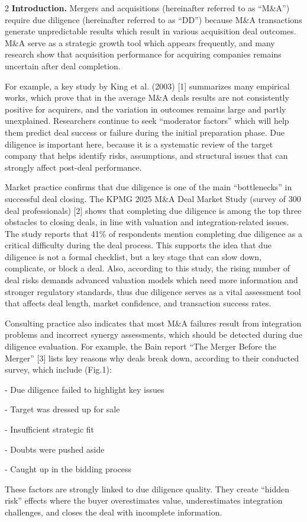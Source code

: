 \begin{multicols}{2}
{\bfseries Introduction.} Mergers and acquisitions (here\-inafter referred to
as ``M\&A'') require due diligence (hereinafter referred to as ``DD'')
because M\&A transactions generate unpredictable results which result in
various acquisition deal outcomes. M\&A serve as a strategic growth tool
which appears frequently, and many research show that acquisition
performance for acquiring companies remains uncertain after deal
completion.

For example, a key study by King et al. (2003) {[}1{]} summarizes many
empirical works, which prove that in the average M\&A deals results are
not consistently positive for acquirers, and the variation in outcomes
remains large and partly unexplained. Researchers continue to seek
``moderator factors'' which will help them predict deal success or
failure during the initial preparation phase. Due diligence is important
here, because it is a systematic review of the target company that helps
identify risks, assumptions, and structural issues that can strongly
affect post-deal performance.

Market practice confirms that due diligence is one of the main
``bottlenecks'' in successful deal closing. The KPMG 2025 M\&A Deal
Market Study (survey of 300 deal professionals) {[}2{]} shows that
completing due diligence is among the top three obstacles to closing
deals, in line with valuation and integration-related issues. The study
reports that 41\% of respondents mention completing due diligence as a
critical difficulty during the deal process. This supports the idea that
due diligence is not a formal checklist, but a key stage that can slow
down, complicate, or block a deal. Also, according to this study, the
rising number of deal risks demands advanced valuation models which need
more information and stronger regulatory standards, thus due diligence
serves as a vital assessment tool that affects deal length, market
confidence, and transaction success rates.

Consulting practice also indicates that most M\&A failures result from
integration problems and incorrect synergy assessments, which should be
detected during due diligence evaluation. For example, the Bain report
``The Merger Before the Merger'' {[}3{]} lists key reasons why deals
break down, according to their conducted survey, which include (Fig.1):

- Due diligence failed to highlight key issues

- Target was dressed up for sale

- Insufficient strategic fit

- Doubts were pushed aside

- Caught up in the bidding process

These factors are strongly linked to due diligence quality. They create
``hidden risk'' effects where the buyer overestimates value,
underestimates integration challenges, and closes the deal with
incomplete information.
\end{multicols}

